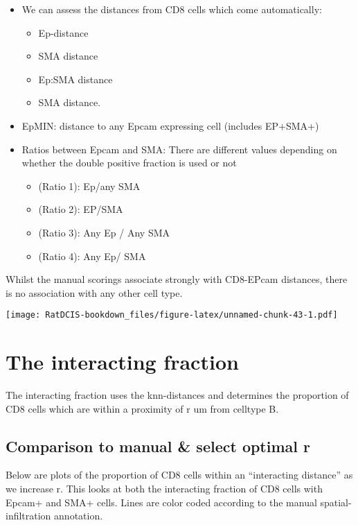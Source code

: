 \documentclass[
]{book}
\providecommand{\tightlist}{%
  \setlength{\itemsep}{0pt}\setlength{\parskip}{0pt}}
\begin{document}
\begin{itemize}
\tightlist
\item
  We can assess the distances from CD8 cells which come automatically:

  \begin{itemize}
  \tightlist
  \item
    Ep-distance
  \item
    SMA distance
  \item
    Ep:SMA distance
  \item
    SMA distance.
  \end{itemize}
\item
  EpMIN: distance to any Epcam expressing cell (includes EP+SMA+)
\item
  Ratios between Epcam and SMA: There are different values depending on whether the double positive fraction is used or not

  \begin{itemize}
  \tightlist
  \item
    (Ratio 1): Ep/any SMA
  \item
    (Ratio 2): EP/SMA
  \item
    (Ratio 3): Any Ep / Any SMA
  \item
    (Ratio 4): Any Ep/ SMA
  \end{itemize}
\end{itemize}

Whilst the manual scorings associate strongly with CD8-EPcam distances, there is no association with any other cell type.

\texttt{[image: RatDCIS-bookdown\_files/figure-latex/unnamed-chunk-43-1.pdf]}

\hypertarget{the-interacting-fraction}{%
\section{The interacting fraction}\label{the-interacting-fraction}}

The interacting fraction uses the knn-distances and determines the proportion of CD8 cells which are within a proximity of r um from celltype B.

\hypertarget{comparison-to-manual-select-optimal-r}{%
\subsection{Comparison to manual \& select optimal r}\label{comparison-to-manual-select-optimal-r}}

Below are plots of the proportion of CD8 cells within an ``interacting distance'' as we increase r. This looks at both the interacting fraction of CD8 cells with Epcam+ and SMA+ cells. Lines are color coded according to the manual spatial-infiltration annotation.
\end{document}
